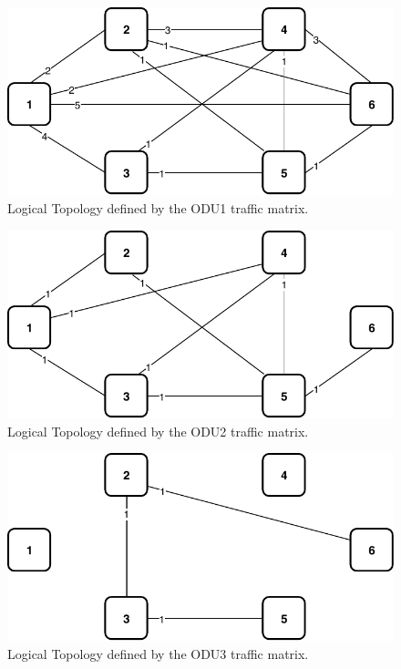 \begin{figure}[h!]
\centering
\includegraphics[width=12cm]{sdf/ilp/transparent_survivability/figures/logical_topology_ODU1_low}
\caption{Logical Topology defined by the ODU1 traffic matrix.}
\label{logical2_ODU1_low}
\end{figure}

\begin{figure}[h!]
\centering
\includegraphics[width=12cm]{sdf/ilp/transparent_survivability/figures/logical_topology_ODU2_low}
\caption{Logical Topology defined by the ODU2 traffic matrix.}
\label{logical2_ODU2_low}
\end{figure}

\begin{figure}[h!]
\centering
\includegraphics[width=12cm]{sdf/ilp/transparent_survivability/figures/logical_topology_ODU3_low}
\caption{Logical Topology defined by the ODU3 traffic matrix.}
\label{logical2_ODU3_low}
\end{figure}

